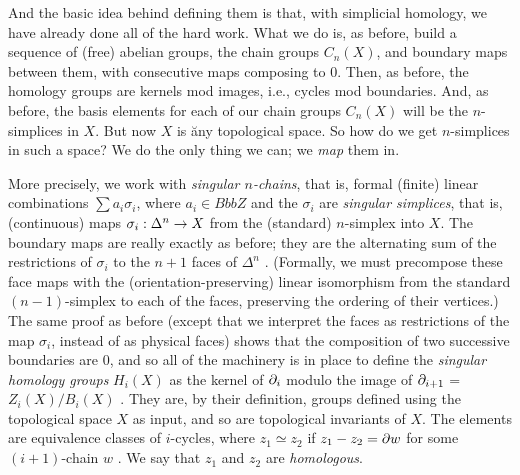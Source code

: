 \msk

And the basic idea behind defining them is that, with simplicial homology,
we have already done all of the hard work. What we do is, as before, build a 
sequence of (free) abelian groups, the chain groups $C_n(X)$, 
and boundary maps between them,
with consecutive maps composing to 0. Then, as before, the homology groups are
kernels mod images, i.e., cycles mod boundaries. And, as before, the basis
elements for each of our chain groups $C_n(X)$ will be the $n$-simplices
in $X$. But now $X$ is \u{any} topological space. So how do we get $n$-simplices
in such a space? We do the only thing we can; we {\it map} them in. 

\msk

More precisely, we work with {\it singular $n$-chains}, that is,
formal (finite) linear combinations $\sum a_i\sigma_i$, where $a_i\in{Bbb Z}$
and the $\sigma_i$ are {\it singular simplices}, that is, (continuous) 
maps $\sigma_i:\Delta^n\rightarrow X$ from the (standard) $n$-simplex into $X$.
The boundary maps are really exactly as before; they are the alternating sum of
the restrictions of $\sigma_i$ to the $n+1$ faces of $\Delta^n$ . (Formally,
we must precompose these face maps with the (orientation-preserving) linear
isomorphism from the standard $(n-1)$-simplex to each of the faces, preserving
the ordering of their vertices.) The same proof as before (except that we interpret
the faces as restrictions of the map $\sigma_i$, instead of as physical faces)
shows that the composition of two successive boundaries are 0,
and so all of the machinery is in place to define the {\it singular homology
groups} $H_i(X)$ as the kernel of $\partial_i$ modulo the image of $\partial_{i+1}$ = $Z_i(X)/B_i(X)$ .
They are, by their definition, groups defined using the topological space $X$ as input,
and so are topological invariants of $X$. The elements are equivalence classes of $i$-cycles,
where $z_1\simeq z_2$ if $z_1-z_2=\partial w$ for some $(i+1)$-chain $w$ . We say that $z_1$ and $z_2$ are
{\it homologous}.

\bsk


